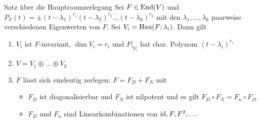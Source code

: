 \begin{nosatz}{Satz über die Hauptraumzerlegung}
    Sei $F \in \operatorname{End}(V)$ und $P_F(t) = \pm (t - \lambda_1)^{r_1} (t - \lambda_2)^{r_2} \dots (t - \lambda_k)^{r_k}$ mit den $\lambda_{1}, \ldots, \lambda_{k}$ paarweise verschiedenen Eigenwerten von $F$. Sei $V_i = \operatorname{Hau}(F;\lambda_i)$. Dann gilt
    \begin{enumerate}
        \item   $V_i$ ist $F$-invariant, $\dim V_i = r_i$ und $F|_{V_i}$ hat char. Polynom $(t - \lambda_i)^{r_i}$
        \item   $V = V_1 \oplus \ldots \oplus V_k$
        \item   $F$ lässt sich eindeutig zerlegen: $F = F_D + F_N$ mit 
        \begin{itemize}
            \item   $F_D$ ist diagonalisierbar und $F_N$ ist nilpotent und es gilt $F_D \circ F_N = F_n \circ F_D$
            \item   $F_D$ und $F_n$ sind Linearkombinationen von $\operatorname{id}, F, F^2, \ldots$ 
        \end{itemize}
    \end{enumerate}
\end{nosatz}


    
